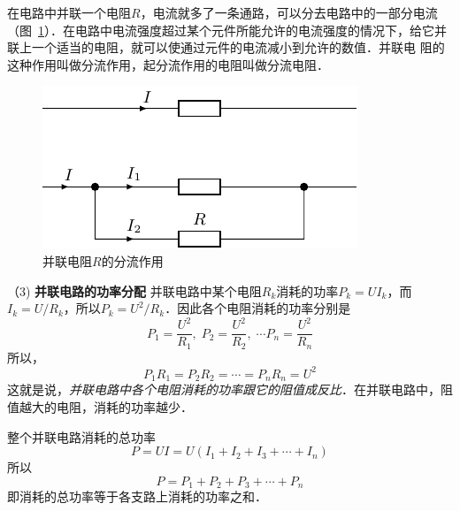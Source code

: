 在电路中并联一个电阻$R$，电流就多了一条通路，可以分去电路中的一部分电流（图~\ref{fig_B_7-12}）．在电路中电流强度超过某个元件所能允许的电流强度的情况下，给它并联上一个适当的电阻，就可以使通过元件的电流减小到允许的数值．并联电
阻的这种作用叫做分流作用，起分流作用的电阻叫做分流电阻．
\begin{figure}[htbp]
    \centering
    \includegraphics{fig/B/7-12.pdf}
    \caption{并联电阻$R$的分流作用}\label{fig_B_7-12}
\end{figure}

（3) \textbf{并联电路的功率分配} 并联电路中某个电阻$R_k$消耗的功率$P_k=UI_k$，而$I_k=U/R_k$，所以$P_k=U^2/R_k$．因此各个电阻消耗的功率分别是
\[ P_1=\frac{U^2}{R_1},\;  P_2=\frac{U^2}{R_2},\; \cdots  P_n=\frac{U^2}{R_n} \]
所以，
\[P_1R_1=P_2R_2=\cdots=P_nR_n=U^2 \]
这就是说，\textit{并联电路中各个电阻消耗的功率跟它的阻值成反比}．在并联电路中，阻值越大的电阻，消耗的功率越少．

整个并联电路消耗的总功率
\[P=UI=U (I_1+I_2+I_3+\cdots+I_n) \]
所以
\[P=P_1+P_2+P_3+\cdots+P_n\]
即消耗的总功率等于各支路上消耗的功率之和．

